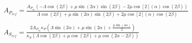 \begin{solution}
    \begin{align*}
        &A_{P_{ref}} = \frac{
            A_{P_{in}} (- \Lambda \cos(2 \beta) + \mu \sin(2\alpha)\sin(2\beta) - 2 \mu \cos[2](\alpha) \cos(2\beta))
        }{
            \Lambda \cos(2 \beta) + \mu \sin(2 \alpha) \sin(2\beta) + 2 \mu \cos[2](\alpha) \cos(2 \beta)
        } \\
        \\
        &A_{S_{ref}} = \frac{
            2 A_{P_{in}} \kappa_P (\Lambda \sin(2 \alpha) + \mu \sin(2 \alpha) + \frac{\mu \sin(4 \alpha)}{2})
        }{
            \kappa_S (\Lambda \cos(2 \beta) + \mu \cos(2 \beta) + \mu \cos(2\alpha - 2\beta) )
        }\\
    \end{align*}
\end{solution}